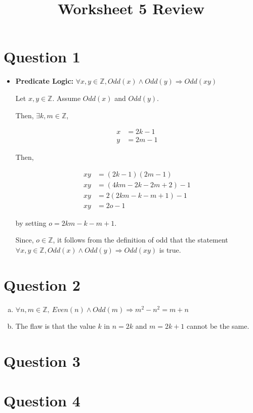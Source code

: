 \documentclass[12pt]{article}
\begin{document}
\title{Worksheet 5 Review}
\maketitle

\section*{Question 1}
\begin{itemize}
    \item

    \textbf{Predicate Logic:} $\forall x,y \in \mathbb{Z}, Odd(x) \land Odd(y)
    \Rightarrow Odd(xy)$

    \bigskip

    Let $x,y \in \mathbb{Z}$. Assume $Odd(x)$ and $Odd(y)$.

    \bigskip

    Then, $\exists k,m \in \mathbb{Z}$,

    \begin{align}
        x &= 2k - 1\\
        y &= 2m - 1
    \end{align}

    \bigskip

    Then,

    \begin{align}
        xy &= (2k-1)(2m-1)\\
        xy &= (4km - 2k - 2m + 2) - 1\\
        xy &= 2(2km - k - m + 1) - 1\\
        xy &= 2o - 1
    \end{align}

    by setting $o = 2km - k - m + 1$.

    \bigskip

    Since, $o \in \mathbb{Z}$, it follows from the definition of odd that the statement
    $\forall x,y \in \mathbb{Z}, Odd(x) \land Odd(y) \Rightarrow Odd(xy)$ is true.
\end{itemize}

\section*{Question 2}
\begin{enumerate}[a.]
    \item

    $\forall n,m \in \mathbb{Z},\:Even(n) \land Odd(m) \Rightarrow m^2 - n^2 = m + n$

    \item

    The flaw is that the value $k$ in $n = 2k$ and $m = 2k + 1$ cannot be the same.
\end{enumerate}
\section*{Question 3}

\section*{Question 4}
\end{document}
